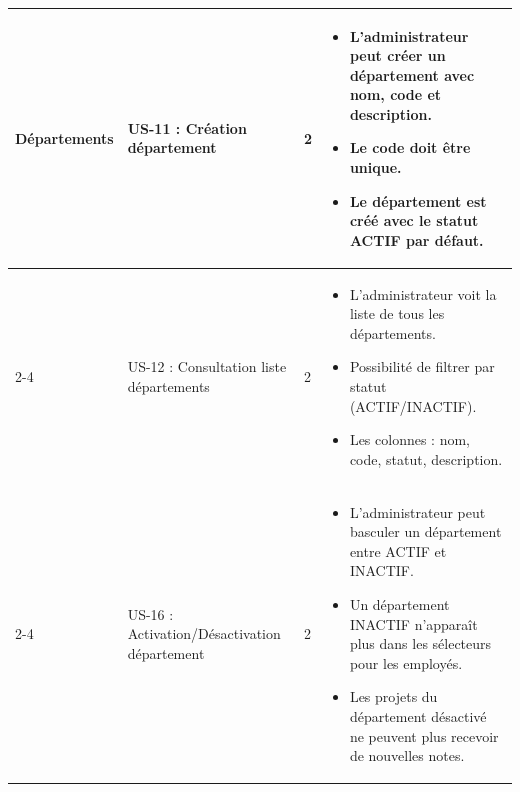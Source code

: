 \documentclass[12pt,a4paper]{report}
\begin{document}
\begin{longtable}{|p{2.5cm}|p{3cm}|p{1.5cm}|p{8cm}|}
\multirow{3}{*}{Départements} & US-11 : Création département & 2 & \begin{itemize}
 \item L’administrateur peut créer un département avec nom, code et description.
 \item Le code doit être unique.
 \item Le département est créé avec le statut ACTIF par défaut.
\end{itemize} \\
\cline{2-4}
& US-12 : Consultation liste départements & 2 & \begin{itemize}
 \item L’administrateur voit la liste de tous les départements.
 \item Possibilité de filtrer par statut (ACTIF/INACTIF).
 \item Les colonnes : nom, code, statut, description.
\end{itemize} \\
\cline{2-4}
& US-16 : Activation/Désactivation département & 2 & \begin{itemize}
 \item L’administrateur peut basculer un département entre ACTIF et INACTIF.
 \item Un département INACTIF n’apparaît plus dans les sélecteurs pour les employés.
 \item Les projets du département désactivé ne peuvent plus recevoir de nouvelles notes.
\end{itemize} \\
\hline


\end{longtable}
\end{document}
